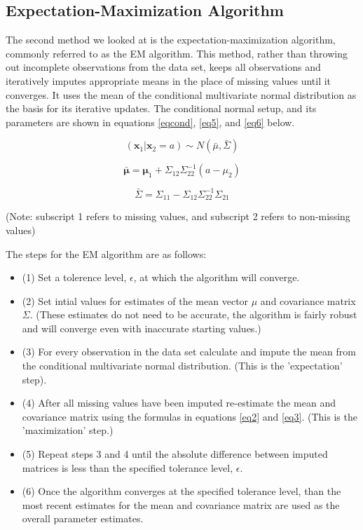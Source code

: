 \documentclass{svproc}
\begin{document}
\subsection{Expectation-Maximization Algorithm}

The second method we looked at is the expectation-maximization algorithm, commonly referred to as the EM algorithm. This method, rather than throwing out incomplete observations from the data set, keeps all observations and iteratively imputes appropriate means in the place of missing values until it converges. It uses the mean of the conditional multivariate normal distribution as the basis for its iterative updates. The conditional normal setup, and its parameters are shown in equations \ref{eqcond}, \ref{eq5}, and \ref{eq6} below.


\begin{equation}
(\mathbf{x}_1 | \mathbf{x}_2=a) \sim N(\bar{\mu},\bar{\Sigma})
\label{eqcond}
\end{equation}

\begin{equation}
\mathbf{\bar{\mu}} = \mathbf{\mu}_1 + \Sigma_{12}\Sigma_{22}^{-1}(a-\mu_{2})
\label{eq5}
\end{equation}

\begin{equation}
\bar{\Sigma} = \Sigma_{11} - \Sigma_{12}\Sigma_{22}^{-1}\Sigma_{21}
\label{eq6}
\end{equation}

(Note: subscript 1 refers to missing values, and subscript 2 refers to non-missing values)


\medskip

The steps for the EM algorithm are as follows:
\begin{itemize}
\item (1) Set a tolerence level, $\epsilon$, at which the algorithm will converge.
\item (2) Set intial values for estimates of the mean vector $\mu$ and covariance matrix $\Sigma$.
(These estimates do not need to be accurate, the algorithm is fairly robust and will converge even with inaccurate starting values.)
\item (3) For every observation in the data set calculate and impute the mean from the conditional multivariate normal distribution. (This is the 'expectation' step).
\item (4) After all missing values have been imputed re-estimate the mean and covariance matrix using the formulas in equations \ref{eq2} and \ref{eq3}.
(This is the 'maximization' step.)
\item (5) Repeat steps 3 and 4 until the absolute difference between imputed matrices is less than the specified tolerance level, $\epsilon$. 
\item (6) Once the algorithm converges at the specified tolerance level, than the most recent estimates for the mean and covariance matrix are used as the overall parameter estimates. 
\end{itemize}
\end{document}
